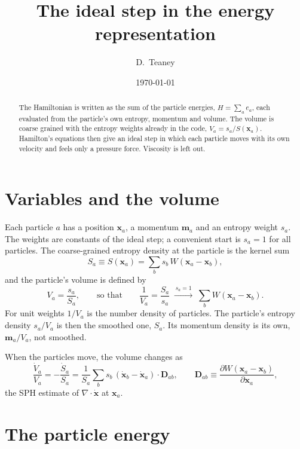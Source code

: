 \documentclass[11pt,aps,preprint,nofootinbib,superscriptaddress,tightenlines]{revtex4-2}
\def\st{\begin{equation}}
\def\stp{\end{equation}}
\begin{document}
\title{The ideal step in the energy representation}
\author{D.~Teaney}
\date{\today}

\begin{abstract}
The Hamiltonian is written as the sum of the particle energies,
$H=\sum_ae_a$, each evaluated from the particle's own entropy, momentum and
volume.  The volume is coarse grained with the entropy weights already in the
code, $V_a=s_a/S(\bm x_a)$.  Hamilton's equations then give an ideal step in
which each particle moves with its own velocity and feels only a pressure force.
Viscosity is left out.
\end{abstract}

\maketitle

\section{Variables and the volume}
\label{sec:vars}

Each particle $a$ has a position $\bm x_a$, a momentum $\bm m_a$ and an entropy
weight $s_a$.  The weights are constants of the ideal step; a convenient start
is $s_a=1$ for all particles.  The coarse-grained entropy density at the
particle is the kernel sum
\st
S_a\equiv S(\bm x_a)=\sum_bs_b\,W(\bm x_a-\bm x_b),
\stp
and the particle's volume is defined by
\st
V_a=\frac{s_a}{S_a},\qquad\text{so that}\qquad \frac1{V_a}=\frac{S_a}{s_a}
\;\xrightarrow{\,s_a=1\,}\;\sum_bW(\bm x_a-\bm x_b).
\label{Va}
\stp
For unit weights $1/V_a$ is the number density of particles.  The particle's
entropy density $s_a/V_a$ is then the smoothed one, $S_a$.  Its momentum
density is its own, $\bm m_a/V_a$, not smoothed.

When the particles move, the volume changes as
\st
\frac{\dot V_a}{V_a}=-\frac{\dot S_a}{S_a}
=\frac{1}{S_a}\sum_bs_b\,(\dot{\bm x}_b-\dot{\bm x}_a)\cdot\bm D_{ab},
\qquad
\bm D_{ab}\equiv\frac{\partial W(\bm x_a-\bm x_b)}{\partial\bm x_a},
\label{Vdot}
\stp
the SPH estimate of $\nabla\cdot\dot{\bm x}$ at $\bm x_a$.

\section{The particle energy}
\label{sec:energy}
\end{document}
